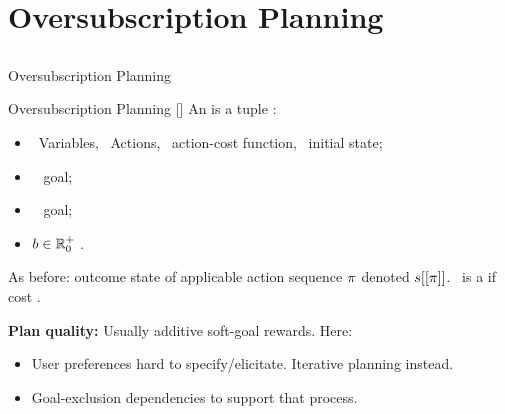 %

\section[OSP]{Oversubscription Planning}
\subsection*{}

\begin{frame}{Oversubscription Planning}

\begin{mydef}{Oversubscription Planning \hfill {\footnotesize [\cite{smith:icaps-04,domshlak:mirkis:jair-15}]}}
An  is a tuple \textred{$\task =
(\vars,\allowbreak\acts,\allowbreak\cost,\allowbreak\init,\allowbreak\goalhard,\allowbreak\goalsoft,\allowbreak\costbound)$}:
\begin{itemize}
\item \vars\ Variables, \acts\ Actions, \cost\ action-cost function, 
\init\ initial state;
\item \goalhard\  goal;
\item \goalsoft\  goal;
\item ${b} \in {\mathbb{R}}^+_0$ .
\end{itemize}
As before: outcome state of applicable action sequence $\pi$ denoted
$s[[\pi]]$. \plan\ is a  if
cost .
%
%
\end{mydef}

\bigskip \pause

\textbf{Plan quality:} Usually additive soft-goal rewards. \pause Here:

\begin{itemize}
\item User preferences hard to specify/elicitate. Iterative planning instead.
\item Goal-exclusion dependencies to support that process.
\end{itemize}

\medskip

\end{frame}


